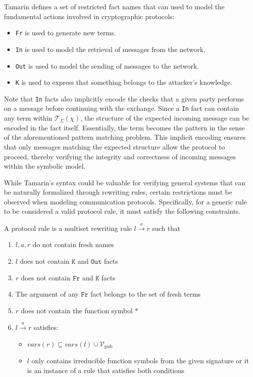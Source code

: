 Tamarin defines a set of restricted fact names that can used to model the fundamental actions involved in cryptographic protocols:

\begin{itemize}
    \item \texttt{Fr} is used to generate new terms.
    \item \texttt{In} is used to model the retrieval of messages from the network.
    \item \texttt{Out} is used to model the sending of messages to the network.
    \item \texttt{K} is used to express that something belongs to the attacker's knowledge.
\end{itemize}

Note that \texttt{In} facts also implicitly encode the checks that a given party performs on a message before continuing with the exchange. Since a \texttt{In} fact can contain any term within $\mathcal{T}_\Sigma(\chi)$, the structure of the expected incoming message can be encoded in the fact itself. Essentially, the term becomes the pattern in the sense of the aforementioned pattern matching problem. This implicit encoding ensures that only messages matching the expected structure allow the protocol to proceed, thereby verifying the integrity and correctness of incoming messages within the symbolic model.

While Tamarin's syntax could be valuable for verifying general systems that can be naturally formalized through rewriting rules, certain restrictions must be observed when modeling communication protocols. Specifically, for a generic rule to be considered a valid protocol rule, it must satisfy the following constraints.

\begin{definition}
    A protocol rule is a multiset rewriting rule $l \xrightarrow{a} r$ such that
    \begin{enumerate}
        \item $l,a,r$ do not contain fresh names
        \item $l$ does not contain $\texttt{K}$ and $\texttt{Out}$ facts
        \item $r$ does not contain $\texttt{Fr}$ and $\texttt{K}$ facts
        \item The argument of any $\texttt{Fr}$ fact belongs to the set of fresh terms
        \item $r$ does not contain the function symbol $*$
        \item $l \xrightarrow{a} r$ satisfies:
        \begin{itemize}
            \item $vars(r) \subseteq vars(l) \cup \mathcal{V}_\textrm{pub}$
            \item $l$ only contains irreducible function symbols from the given signature or it is an instance of a rule that satisfies both conditions
        \end{itemize}
    \end{enumerate}
\end{definition}

